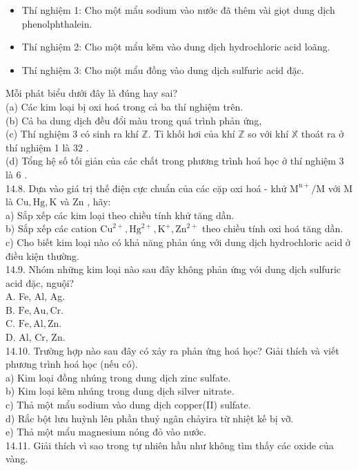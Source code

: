 \documentclass[10pt]{article}
\begin{document}
\begin{itemize}
  \item Thí nghiệm 1: Cho một mẩu sodium vào nước đã thêm vài giọt dung dịch phenolphthalein.
  \item Thí nghiệm 2: Cho một mẩu kẽm vào dung dịch hydrochloric acid loãng.
  \item Thí nghiệm 3: Cho một mẩu đồng vào dung dịch sulfuric acid đặc.
\end{itemize}

Mỗi phát biểu dưới đây là đúng hay sai?\\
(a) Các kim loại bị oxi hoá trong cả ba thí nghiệm trên.\\
(b) Cả ba dung dịch đều đổi màu trong quá trình phản ứng,\\
(c) Thí nghiệm 3 có sinh ra khí $\mathbb{Z}$. Tỉ khối hơi của khí $\mathbb{Z}$ so với khí $\mathbb{X}$ thoát ra ở thí nghiệm 1 là 32 .\\
(d) Tổng hệ số tối giản của các chất trong phương trình hoá học ở thí nghiệm 3 là 6 .\\
14.8. Dựa vào giá trị thế điện cực chuẩn của các cặp oxi hoá - khử $\mathrm{M}^{\mathrm{n}+} / \mathrm{M}$ với M là $\mathrm{Cu}, \mathrm{Hg}, \mathrm{K}$ và Zn , hãy:\\
a) Sắp xếp các kim loại theo chiều tính khử tăng dần.\\
b) Sắp xếp các cation $\mathrm{Cu}^{2+}, \mathrm{Hg}^{2+}, \mathrm{K}^{+}, \mathrm{Zn}^{2+}$ theo chiều tính oxi hoá tăng dần.\\
c) Cho biết kim loại nào có khả năng phản úng với dung dịch hydrochloric acid ở điều kiện thường.\\
14.9. Nhóm những kim loại nào sau đây không phản ứng vói dung dịch sulfuric acid đặc, nguội?\\
A. Fe, Al, Ag.\\
B. $\mathrm{Fe}, \mathrm{Au}, \mathrm{Cr}$.\\
C. $\mathrm{Fe}, \mathrm{Al}, \mathrm{Zn}$.\\
D. Al, Cr, Zn.\\
14.10. Trường hợp nào sau đây có xảy ra phản ứng hoá học? Giải thích và viết phương trình hoá học (nếu có).\\
a) Kim loại đồng nhúng trong dung dịch zinc sulfate.\\
b) Kim loại kẽm nhúng trong dung dịch silver nitrate.\\
c) Thả một mẩu sodium vào dung dịch copper(II) sulfate.\\
d) Rắc bột lưu huỳnh lên phần thuỷ ngân chảyira từ nhiệt kế bị vỡ.\\
e) Thả một mẩu magnesium nóng đỏ vào nước.\\
14.11. Giải thích vì sao trong tự nhiên hầu như không tìm thấy các oxide của vàng.
\end{document}
